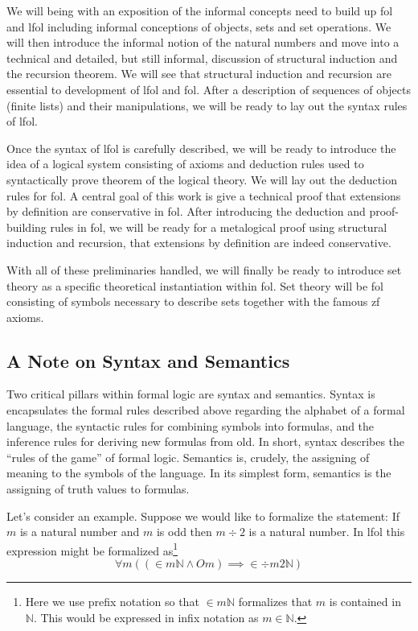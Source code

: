 \documentclass[12pt]{article}
\theoremstyle{break}
\theoremstyle{break}
\theoremstyle{break}
\theoremstyle{break}
\theoremstyle{break}
\newtheorem{informal definition}[definition]{Informal Definition}
\theoremstyle{break}
\newtheorem{informal theorem}[theorem]{Informal Theorem}
\newcommand{\qq}[1]{``#1''}
\begin{document}
	We will being with an exposition of the informal concepts need to build up \gls{fol} and \gls{lfol} including informal conceptions of objects, sets and set operations.
	We will then introduce the informal notion of the natural numbers and move into a technical and detailed, but still informal, discussion of structural induction and the recursion theorem.
	We will see that structural induction and recursion are essential to development of \gls{lfol} and \gls{fol}.
	After a description of sequences of objects (finite lists) and their manipulations, we will be ready to lay out the syntax rules of \gls{lfol}.
	
	Once the syntax of \gls{lfol} is carefully described, we will be ready to introduce the idea of a logical system consisting of axioms and deduction rules used to syntactically prove theorem of the logical theory.
	We will lay out the deduction rules for \gls{fol}.
	A central goal of this work is give a technical proof that extensions by definition are conservative in \gls{fol}. 
	After introducing the deduction and proof-building rules in \gls{fol}, we will be ready for a metalogical proof using structural induction and recursion, that extensions by definition are indeed conservative.
	
	With all of these preliminaries handled, we will finally be ready to introduce set theory as a specific theoretical instantiation within \gls{fol}.
	Set theory will be \gls{fol} consisting of symbols necessary to describe sets together with the famous \gls{zf} axioms.
	
	\subsection{A Note on Syntax and Semantics}
	
	Two critical pillars within formal logic are syntax and semantics.
	Syntax is encapsulates the formal rules described above regarding the alphabet of a formal language, the syntactic rules for combining symbols into formulas, and the inference rules for deriving new formulas from old.
	In short, syntax describes the \qq{rules of the game} of formal logic.
	Semantics is, crudely, the assigning of meaning to the symbols of the language.
	In its simplest form, semantics is the assigning of truth values to formulas.
	
	Let's consider an example.
	Suppose we would like to formalize the statement: If $m$ is a natural number and $m$ is odd then $m \div 2$ is a natural number.
	In \gls{lfol} this expression might be formalized as\footnote{Here we use prefix notation so that $\in m \mathbb{N}$ formalizes that $m$ is contained in $\mathbb{N}$. This would be expressed in infix notation as $m\in \mathbb{N}$.}
	\begin{equation*}
		\forall m((\in m \mathbb{N} \land Om) \implies \in \div m 2 \mathbb{N})
	\end{equation*}
	
\end{document}
